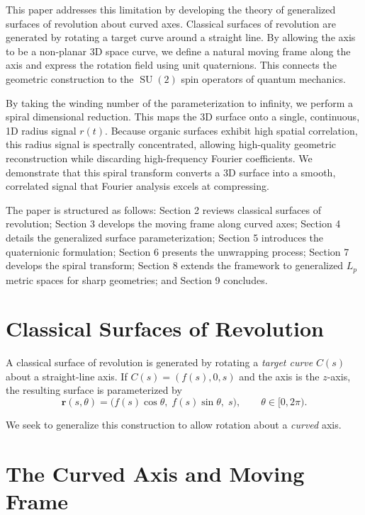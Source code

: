 \documentclass[11pt,twoside]{article}
\begin{document}
This paper addresses this limitation by developing the theory of generalized surfaces of revolution about curved axes. Classical surfaces of revolution are generated by rotating a target curve around a straight line. By allowing the axis to be a non-planar 3D space curve, we define a natural moving frame along the axis and express the rotation field using unit quaternions. This connects the geometric construction to the $\operatorname{SU}(2)$ spin operators of quantum mechanics.

By taking the winding number of the parameterization to infinity, we perform a spiral dimensional reduction. This maps the 3D surface onto a single, continuous, 1D radius signal $r(t)$. Because organic surfaces exhibit high spatial correlation, this radius signal is spectrally concentrated, allowing high-quality geometric reconstruction while discarding high-frequency Fourier coefficients. We demonstrate that this spiral transform converts a 3D surface into a smooth, correlated signal that Fourier analysis excels at compressing.

The paper is structured as follows: Section 2 reviews classical surfaces of revolution; Section 3 develops the moving frame along curved axes; Section 4 details the generalized surface parameterization; Section 5 introduces the quaternionic formulation; Section 6 presents the unwrapping process; Section 7 develops the spiral transform; Section 8 extends the framework to generalized $L_p$ metric spaces for sharp geometries; and Section 9 concludes.

\section{Classical Surfaces of Revolution}

A classical surface of revolution is generated by rotating a \emph{target curve} $C(s)$ about a straight-line axis. If $C(s) = (f(s), 0, s)$ and the axis is the $z$-axis, the resulting surface is parameterized by
\begin{equation}
	\mathbf{r}(s, \theta) = \bigl(f(s)\cos\theta, \; f(s)\sin\theta, \; s\bigr), \qquad \theta \in [0, 2\pi).
\end{equation}

We seek to generalize this construction to allow rotation about a \emph{curved} axis.

\section{The Curved Axis and Moving Frame}
\end{document}
